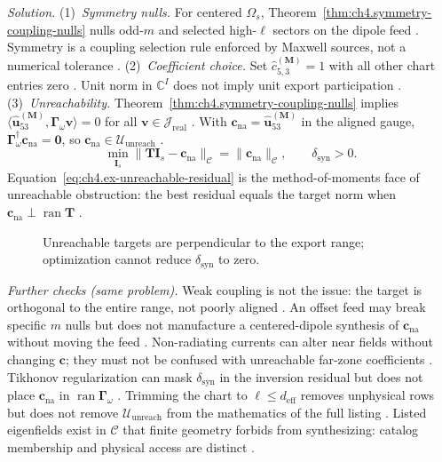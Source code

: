 \emph{Solution.} (1)~\emph{Symmetry nulls.} For centered $\Omega_{s}$, Theorem~\ref{thm:ch4.symmetry-coupling-nulls} nulls odd-$m$ and selected high-$\ell$ sectors on the dipole feed . Symmetry is a coupling selection rule enforced by Maxwell sources, not a numerical tolerance .
(2)~\emph{Coefficient choice.} Set $\widehat{c}_{5,3}^{(\mathbf{M})}=1$ with all other chart entries zero . Unit norm in $\mathbb{C}^{I}$ does not imply unit export participation .
(3)~\emph{Unreachability.} Theorem~\ref{thm:ch4.symmetry-coupling-nulls} implies $\langle\widehat{\mathbf{u}}_{53}^{(\mathbf{M})},\boldsymbol{\Gamma}_\omega\mathbf{v}\rangle=0$ for all $\mathbf{v}\in\mathcal{J}_{\mathrm{real}}$ . With $\mathbf{c}_{\mathrm{na}}=\widehat{\mathbf{u}}_{53}^{(\mathbf{M})}$ in the aligned gauge, $\boldsymbol{\Gamma}_\omega^{\dagger}\mathbf{c}_{\mathrm{na}}=\mathbf{0}$, so $\mathbf{c}_{\mathrm{na}}\in\mathcal{U}_{\mathrm{unreach}}$ .
\begin{equation}
\label{eq:ch4.ex-unreachable-residual}
\min_{\mathbf{I}_{s}}\|\mathbf{T}\mathbf{I}_{s}-\mathbf{c}_{\mathrm{na}}\|_{\mathcal{C}}
=
\|\mathbf{c}_{\mathrm{na}}\|_{\mathcal{C}},
\qquad
\delta_{\mathrm{syn}}>0.
\end{equation}
Equation~\eqref{eq:ch4.ex-unreachable-residual} is the method-of-moments face of unreachable obstruction: the best residual equals the target norm when $\mathbf{c}_{\mathrm{na}}\perp\operatorname{ran}\mathbf{T}$ .
\begin{figure}[t]
\centering
{}
\caption{Unreachable targets are perpendicular to the export range; optimization cannot reduce $\delta_{\mathrm{syn}}$ to zero.}
\label{fig:ch4.ex-unreachable-residual}
\end{figure}
\emph{Further checks (same problem).} Weak coupling is not the issue: the target is orthogonal to the entire range, not poorly aligned . An offset feed may break specific $m$ nulls but does not manufacture a centered-dipole synthesis of $\mathbf{c}_{\mathrm{na}}$ without moving the feed . Non-radiating currents can alter near fields without changing $\mathbf{c}$; they must not be confused with unreachable far-zone coefficients . Tikhonov regularization can mask $\delta_{\mathrm{syn}}$ in the inversion residual but does not place $\mathbf{c}_{\mathrm{na}}$ in $\operatorname{ran}\boldsymbol{\Gamma}_\omega$ . Trimming the chart to $\ell\le d_{\mathrm{eff}}$ removes unphysical rows but does not remove $\mathcal{U}_{\mathrm{unreach}}$ from the mathematics of the full listing .
Listed eigenfields exist in $\mathcal{C}$ that finite geometry forbids from synthesizing: catalog membership and physical access are distinct .
